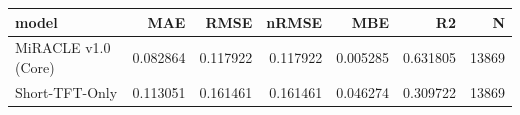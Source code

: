 \begin{tabular}{lrrrrrr}
\toprule
model & MAE & RMSE & nRMSE & MBE & R2 & N \\
\midrule
MiRACLE v1.0 (Core) & 0.082864 & 0.117922 & 0.117922 & 0.005285 & 0.631805 & 13869 \\
Short-TFT-Only & 0.113051 & 0.161461 & 0.161461 & 0.046274 & 0.309722 & 13869 \\
\bottomrule
\end{tabular}
